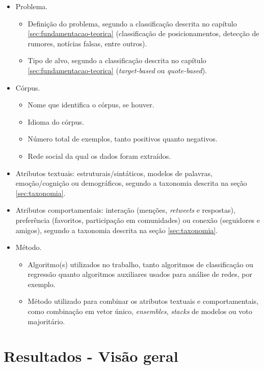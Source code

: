 \documentclass[
	12pt, oneside, a4paper, english, brazil
]{abntex2ppgsi}
\begin{document}
\begin{itemize}
     \item Problema.
     \begin{itemize}
         \item Definição do problema, segundo a classificação descrita no capítulo \ref{sec:fundamentacao-teorica} (classificação de posicionamentos, detecção de rumores, notícias falsas, entre outros).
         \item Tipo de alvo, segundo a classificação descrita no capítulo \ref{sec:fundamentacao-teorica} ({\em target-based} ou {\em quote-based}).
     \end{itemize}
    \item Córpus.
    \begin{itemize}
        \item Nome que identifica o córpus, se houver.
        \item Idioma do córpus.
        \item Número total de exemplos, tanto positivos quanto negativos.
        \item Rede social da qual os dados foram extraídos.
    \end{itemize}
    \item Atributos textuais: estruturais/sintáticos, modelos de palavras, emoção/cognição ou demográficos, segundo a taxonomia descrita na seção \ref{sec:taxonomia}.
    \item Atributos comportamentais: interação (menções, {\em retweets} e respostas), preferência (favoritos, participação em comunidades) ou conexão (seguidores e amigos), segundo a taxonomia descrita na seção  \ref{sec:taxonomia}.
    \item Método.
    \begin{itemize}
        \item Algoritmo(s) utilizados no trabalho, tanto algoritmos de classificação ou regressão quanto algoritmos auxiliares usados para análise de redes, por exemplo.
        \item Método utilizado para combinar os atributos textuais e comportamentais, como combinação em vetor único, {\em ensembles}, {\em stacks} de modelos ou voto majoritário.
    \end{itemize}
\end{itemize}

\section{Resultados - Visão geral}
\label{sec:visao-geral}
\end{document}
